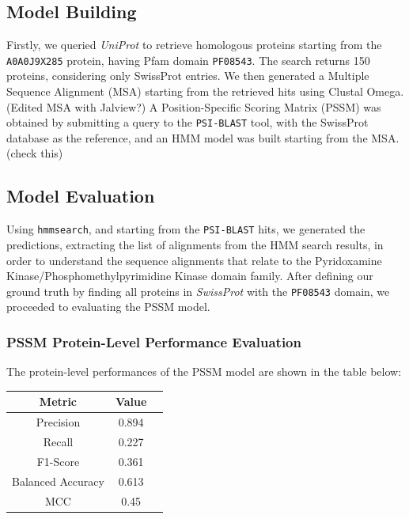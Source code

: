 \documentclass[10pt,twocolumn,letterpaper]{article}
\begin{document}
\subsection{Model Building}

Firstly, we queried \textit{UniProt} to retrieve homologous proteins starting from the \texttt{A0A0J9X285} protein, having Pfam domain \texttt{PF08543}. The search returns 150 proteins, considering only SwissProt entries. We then generated a Multiple Sequence Alignment (MSA) starting from the retrieved hits using Clustal Omega.
(Edited MSA with Jalview?)
A Position-Specific Scoring Matrix (PSSM) was obtained by submitting a query to the \texttt{PSI-BLAST} tool, with the SwissProt database as the reference, and an HMM model was built starting from the MSA. (check this)


\subsection{Model Evaluation}

Using \texttt{hmmsearch}, and starting from the \texttt{PSI-BLAST} hits, we generated the predictions, extracting the list of alignments from the HMM search results, in order to understand the sequence alignments that relate to the Pyridoxamine Kinase/Phosphomethylpyrimidine Kinase domain family.
After defining our ground truth by finding all proteins in \textit{SwissProt} with the \texttt{PF08543} domain, we proceeded to evaluating the PSSM model.



\subsubsection{PSSM Protein-Level Performance Evaluation}

The protein-level performances of the PSSM model are shown in the table below:

\begin{center}
    \begin{tabular}{ccc}
        \toprule
        Metric & Value \\
        \midrule
        Precision & 0.894 \\
        Recall & 0.227 \\
        F1-Score & 0.361 \\
        Balanced Accuracy & 0.613 \\
        MCC & 0.45 \\
        \bottomrule
    \end{tabular}
\end{center} 
\end{document}
